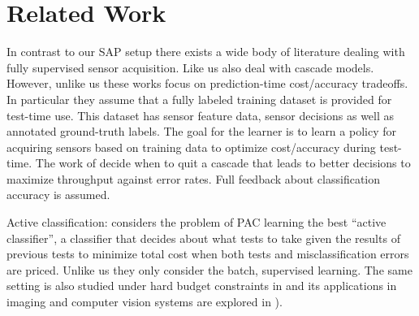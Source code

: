 %
%

\section{Related Work}
%

In contrast to our SAP setup there exists a wide body of literature dealing with fully supervised sensor acquisition. Like us \cite{AISTATS13_SupervisedSequentialLearning_TrapezSaligram} \cite{NIPS2015_DirectedAcyclic_WangTrapezSaligram}  \cite{NIPS2015_FeatureBudgeted_NanWangSaligrama} also deal with cascade models. However, unlike us these works focus on prediction-time cost/accuracy tradeoffs. In particular they assume that a fully labeled training dataset is provided for test-time use. This dataset has sensor feature data, sensor decisions as well as annotated ground-truth labels. The goal for the learner is to learn a policy for acquiring sensors based on training data to optimize cost/accuracy during test-time. The work of
\cite{poczos2009} decide when to quit a cascade that leads to better decisions to maximize throughput against error rates. Full feedback about classification accuracy is assumed.

Active classification: \citet{ActiveClass-AIJ-s} considers the problem of PAC learning the best ``active classifier'', a classifier that decides about what tests to take given the results of previous tests to minimize total cost when both tests and misclassification errors are priced.
Unlike us they only consider the batch, supervised learning. The same setting is also studied under hard budget constraints in \cite{LCunderBudget-ECML05} and its applications in imaging and computer vision systems are explored in  \citep{ADORE-99,isukapalli01efficient-ICJAI}).

